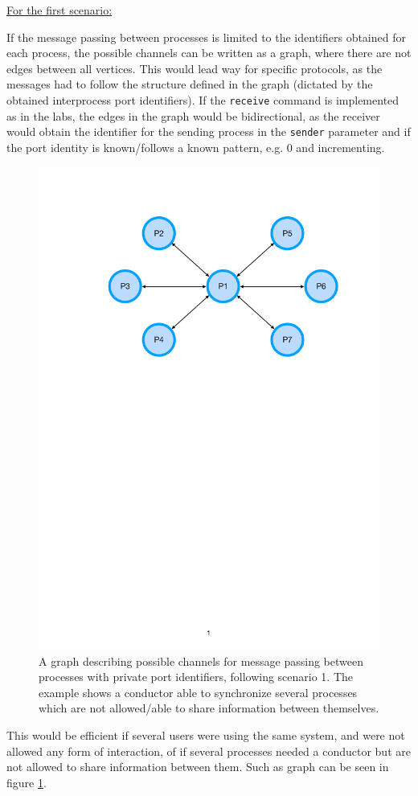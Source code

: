 \underline{For the first scenario:}

If the message passing between processes is limited to the identifiers obtained for each process, the possible channels can be written as a graph, where there are not edges between all vertices. This would lead way for specific protocols, as the messages had to follow the structure defined in the graph (dictated by the obtained interprocess port identifiers). If the \texttt{receive} command is implemented as in the labs, the edges in the graph would be bidirectional, as the receiver would obtain the identifier for the sending process in the \texttt{sender} parameter and if the port identity is known/follows a known pattern, e.g. 0 and incrementing.

\begin{figure}
    \centering
    \includegraphics[width=0.7\linewidth]{fig/processGraph.pdf}
    \caption{A graph describing possible channels for message passing between processes with private port identifiers, following scenario 1. The example shows a conductor able to synchronize several processes which are not allowed/able to share information between themselves.}
    \label{fig:conductorGraph}
\end{figure}

This would be efficient if several users were using the same system, and were not allowed any form of interaction, of if several processes needed a conductor but are not allowed to share information between them. Such as graph can be seen in figure \ref{fig:conductorGraph}.

